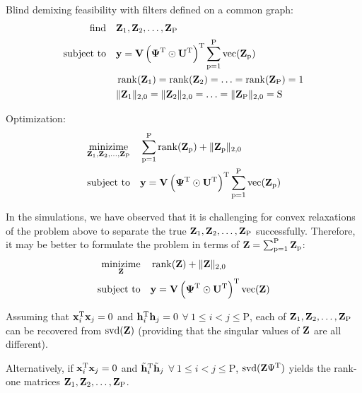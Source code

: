 \documentclass{article}
\newcommand{\numSources}{\text{P}}
\newcommand{\sourceIndex}{\text{p}}
\DeclareMathOperator{\vect}{vec}
\DeclareMathOperator{\rank}{rank}
\DeclareMathOperator{\svd}{svd}
\begin{document}
Blind demixing feasibility with filters defined on a common graph:
\begin{align}
  \mathop{\text{find}} \quad & \bbZ_{1}, \bbZ_{2}, \ldots, \bbZ_{\numSources} \\
  \text{subject to} \quad & \bby = \bbV \left(\bbPsi^{\rmT} \odot \bbU^{\rmT} \right)^{\rmT}\sum_{\sourceIndex=1}^{\numSources} \vect(\bbZ_{\sourceIndex}) \nonumber \\
  & \rank(\bbZ_{1}) = \rank(\bbZ_{2}) = \ldots = \rank(\bbZ_{\numSources}) = 1 \nonumber \\
  & \|\bbZ_{1}\|_{2,0} = \|\bbZ_{2}\|_{2,0} = \ldots = \|\bbZ_{\numSources}\|_{2,0} = \rmS \nonumber
\end{align}

Optimization:
\begin{align}
  \mathop{\text{minizime}}_{\bbZ_{1},\bbZ_{2},\ldots,\bbZ_{\numSources}} \quad & \sum_{\sourceIndex=1}^{\numSources} \rank(\bbZ_{\sourceIndex}) + \|\bbZ_{\sourceIndex}\|_{2,0} \\
  \text{subject to} \quad & \bby = \bbV \left(\bbPsi^{\rmT} \odot \bbU^{\rmT} \right)^{\rmT}\sum_{\sourceIndex=1}^{\numSources} \vect(\bbZ_{\sourceIndex}) \nonumber
\end{align}

In the simulations, we have observed that it is challenging for convex relaxations of the problem above to separate the true $\bbZ_{1},\bbZ_{2},\ldots,\bbZ_{\numSources}$ successfully. Therefore, it may be better to formulate the problem in terms of $\bbZ = \sum_{\sourceIndex=1}^{\numSources} \bbZ_{\sourceIndex}$:
\begin{align}
  \mathop{\text{minizime}}_{\bbZ} \quad & \rank(\bbZ) + \|\bbZ\|_{2,0} \\
  \text{subject to} \quad & \bby = \bbV \left(\bbPsi^{\rmT} \odot \bbU^{\rmT} \right)^{\rmT} \vect(\bbZ) \nonumber
\end{align}

Assuming that ${\mathbf x}_{i}^{{\text{T}}} {\mathbf x}_{j} = 0$ and ${\mathbf h}_{i}^{{\text{T}}} {\mathbf h}_{j} = 0$ $\forall \ 1 \leqslant i < j \leqslant \numSources$, each of $\bbZ_{1},\bbZ_{2},\ldots,\bbZ_{\numSources}$ can be recovered from $\svd(\bbZ)$ (providing that the singular values of ${\mathbf Z}$ are all different).

Alternatively, if ${\mathbf x}_{i}^{{\text{T}}} {\mathbf x}_{j} = 0$ and $\tilde {{\mathbf h}}_{i}^{{\text{T}}} \tilde {{\mathbf h}}_{j}$ $\forall \ 1 \leqslant i < j \leqslant \numSources$, $\svd(\bbZ \Psi^{\rmT})$ yields the rank-one matrices $\bbZ_{1},\bbZ_{2},\ldots,\bbZ_{\numSources}$.
\end{document}
